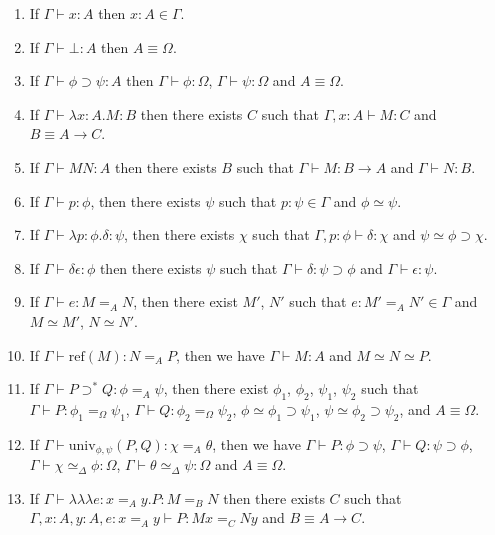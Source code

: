\documentclass[a4paper,UKenglish]{lipics-v2016}
\newcommand*{\reff}[1]{\ensuremath{\mathrm{ref} \left( {#1} \right)}}
\newcommand*{\univ}[4]{\ensuremath{\mathrm{univ}_{{#1}, {#2}} \left({#3} , {#4} \right)}}
\newcommand*{\triplelambda}{\ensuremath{\lambda \!\! \lambda \!\! \lambda}}
\theoremstyle{plain}
\begin{document}
\begin{lemma}[Generation]
$ $
\begin{enumerate}
\item
If $\Gamma \vdash x : A$ then $x : A \in \Gamma$.
\item
If $\Gamma \vdash \bot : A$ then $A \equiv \Omega$.
\item
If $\Gamma \vdash \phi \supset \psi : A$ then $\Gamma \vdash \phi : \Omega$, $\Gamma \vdash \psi : \Omega$ and $A \equiv \Omega$.
\item
If $\Gamma \vdash \lambda x:A.M : B$ then there exists $C$ such that $\Gamma, x : A \vdash M : C$ and $B \equiv A \rightarrow C$.
\item
If $\Gamma \vdash MN : A$ then there exists $B$ such that $\Gamma \vdash M : B \rightarrow A$ and $\Gamma \vdash N : B$.
\item
If $\Gamma \vdash p : \phi$, then there exists $\psi$ such that $p : \psi \in \Gamma$ and $\phi \simeq \psi$.
\item
If $\Gamma \vdash \lambda p:\phi.\delta : \psi$, then there exists $\chi$ such that $\Gamma, p : \phi \vdash \delta : \chi$ and $\psi \simeq \phi \supset \chi$.
\item
If $\Gamma \vdash \delta \epsilon : \phi$ then there exists $\psi$ such that $\Gamma \vdash \delta : \psi \supset \phi$ and $\Gamma \vdash \epsilon : \psi$.
\item
If $\Gamma \vdash e : M =_A N$, then there exist $M'$, $N'$ such that $e : M' =_A N' \in \Gamma$ and $M \simeq M'$, $N \simeq N'$.
\item
If $\Gamma \vdash \reff{M} : N =_A P$, then we have $\Gamma \vdash M : A$ and $M \simeq N \simeq P$.
\item
If $\Gamma \vdash P \supset^* Q : \phi =_A \psi$, then there exist $\phi_1$, $\phi_2$, $\psi_1$, $\psi_2$ such that
$\Gamma \vdash P : \phi_1 =_\Omega \psi_1$, $\Gamma \vdash Q : \phi_2 =_\Omega \psi_2$, $\phi \simeq \phi_1 \supset \psi_1$, $\psi \simeq \phi_2 \supset \psi_2$, and $A \equiv \Omega$.
\item
If $\Gamma \vdash \univ{\phi}{\psi}{P}{Q} : \chi =_A \theta$, then we have $\Gamma \vdash P : \phi \supset \psi$, $\Gamma \vdash Q : \psi \supset \phi$,
$\Gamma \vdash \chi \simeq_\Delta \phi : \Omega$, $\Gamma \vdash \theta \simeq_\Delta \psi : \Omega$ and $A \equiv \Omega$.
\item
If $\Gamma \vdash \triplelambda e : x =_A y. P : M =_B N$ then there exists $C$ such that $\Gamma, x : A, y : A, e : x =_A y \vdash P : M x =_C N y$
and $B \equiv A \rightarrow C$.

\end{enumerate}
\end{lemma}
\end{document}
